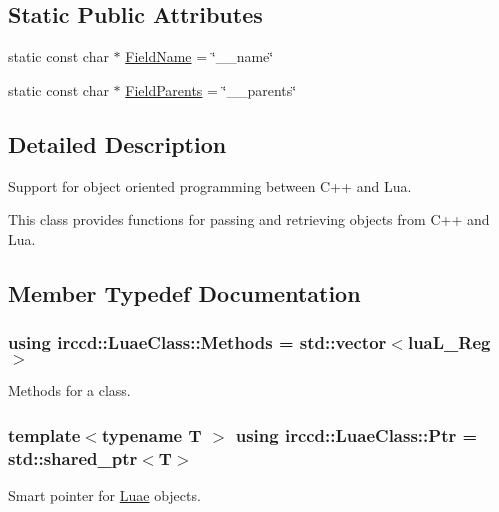 \subsection*{Static Public Attributes}
\begin{DoxyCompactItemize}
\item 
static const char $\ast$ \hyperlink{a00041_a3e37a95a21a5679bfa8b6aef60e90a37}{Field\-Name} = \char`\"{}\-\_\-\-\_\-name\char`\"{}
\item 
static const char $\ast$ \hyperlink{a00041_a7a3e4d84ade883c52375f88ad3ad8e04}{Field\-Parents} = \char`\"{}\-\_\-\-\_\-parents\char`\"{}
\end{DoxyCompactItemize}


\subsection{Detailed Description}
Support for object oriented programming between C++ and Lua. 

This class provides functions for passing and retrieving objects from C++ and Lua. 

\subsection{Member Typedef Documentation}
\hypertarget{a00041_aa25ef6181e424ebf3d1fa42df2bdf145}{
\subsubsection[{Methods}]{\setlength{\rightskip}{0pt plus 5cm}using {\bf irccd\-::\-Luae\-Class\-::\-Methods} =  std\-::vector$<$lua\-L\-\_\-\-Reg$>$}}\label{a00041_aa25ef6181e424ebf3d1fa42df2bdf145}
Methods for a class. \hypertarget{a00041_a213f5d206d7bcfe4712ed9eacad9f0ce}{
\subsubsection[{Ptr}]{\setlength{\rightskip}{0pt plus 5cm}template$<$typename T $>$ using {\bf irccd\-::\-Luae\-Class\-::\-Ptr} =  std\-::shared\-\_\-ptr$<$T$>$}}\label{a00041_a213f5d206d7bcfe4712ed9eacad9f0ce}
Smart pointer for \hyperlink{a00040}{Luae} objects. 

